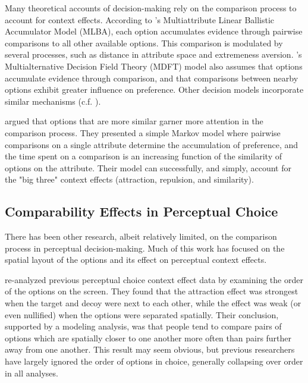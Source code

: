 Many theoretical accounts of decision-making rely on the comparison process to account for context effects. According to \textcite{trueblood2014multiattribute}'s Multiattribute Linear Ballistic Accumulator Model (MLBA), each option accumulates evidence through pairwise comparisons to all other available options. This comparison is modulated by several processes, such as distance in attribute space and extremeness aversion. \textcite{roeMultialternativeDecisionField2001a}'s Multialternative Decision Field Theory (MDFT) model also assumes that options accumulate evidence through comparison, and that comparisons between nearby options exhibit greater influence on preference. Other decision models incorporate similar mechanisms \parencite{usherLossAversionInhibition2004a,noguchiMultialternativeDecisionSampling2018a,wollschlager2NaryChoiceTree2012a,landry2021pairwise} (c.f. \textcite{bhatiaAssociationsAccumulationPreference2013b,bergnerVAMPVotingAgent2019b}). 

\textcite{trueblood2022attentional} argued that options that are more similar garner more attention in the comparison process. They presented a simple Markov model where pairwise comparisons on a single attribute determine the accumulation of preference, and the time spent on a comparison is an increasing function of the similarity of options on the attribute. Their model can successfully, and simply, account for the "big three" context effects (attraction, repulsion, and similarity).

\subsection{Comparability Effects in Perceptual Choice}
There has been other research, albeit relatively limited, on the comparison process in perceptual decision-making. Much of this work has focused on the spatial layout of the options and its effect on perceptual context effects.

\textcite{trueblood2022attentional} re-analyzed previous perceptual choice context effect data \parencite{trueblood2015fragile} by examining the order of the options on the screen. They found that the attraction effect was strongest when the target and decoy were next to each other, while the effect was weak (or even nullified) when the options were separated spatially. Their conclusion, supported by a modeling analysis, was that people tend to compare pairs of options which are spatially closer to one another more often than pairs further away from one another. This result may seem obvious, but previous researchers have largely ignored the order of options in choice, generally collapsing over order in all analyses.


